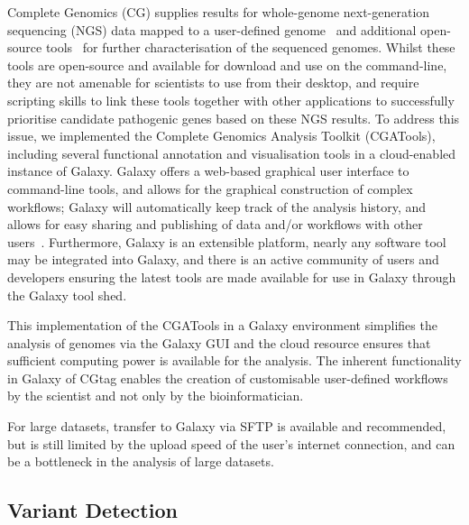 Complete Genomics (CG) supplies results for whole-genome next-generation sequencing (NGS) data mapped to a user-defined genome~\cite{ma} and additional open-source tools~\cite{url-cgatools} for further characterisation of the sequenced genomes. Whilst these tools are open-source and available for download and use on the command-line, they are not amenable for scientists to use from their desktop, and require scripting skills to link these tools together with other applications to successfully prioritise candidate pathogenic genes based on these NGS results. To address this issue, we implemented the Complete Genomics Analysis Toolkit (CGATools), including several functional annotation and visualisation tools in a cloud-enabled instance of Galaxy. Galaxy offers a web-based graphical user interface to command-line tools, and allows for the graphical construction of complex workflows; Galaxy will automatically keep track of the analysis history, and allows for easy sharing and publishing of data and/or workflows with other users~\cite{goecks2010galaxy, blankenberg2010galaxy2, giardine2005galaxy}. Furthermore, Galaxy is an extensible platform, nearly any software tool may be integrated into Galaxy, and there is an active community of users and developers ensuring the latest tools are made available for use in Galaxy through the Galaxy tool shed.

This implementation of the CGATools in a Galaxy environment simplifies the analysis of genomes via the Galaxy GUI and the cloud resource ensures that sufficient computing power is available for the analysis. The inherent functionality in Galaxy of CGtag enables the creation of customisable user-defined workflows by the scientist and not only by the bioinformatician.

For large datasets, transfer to Galaxy via SFTP is available and recommended, but is still limited by the upload speed of the user’s internet connection, and can be a bottleneck in the analysis of large datasets.


\subsection*{Variant Detection}

